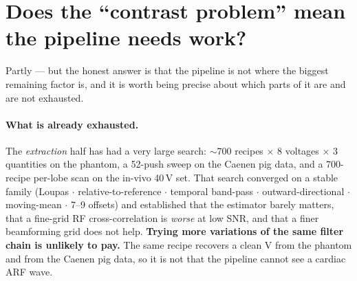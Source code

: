 \documentclass[11pt,a4paper]{article}
\newcommand{\good}[1]{\textcolor{green!45!black}{\textbf{#1}}}
\begin{document}
\section{Does the ``contrast problem'' mean the pipeline needs work?}\label{sec:pipeline}
Partly --- but the honest answer is that the pipeline is not where the biggest remaining factor is,
and it is worth being precise about which parts of it are and are not exhausted.

\paragraph{What is already exhausted.} The \emph{extraction} half has had a very large search:
$\sim$700 recipes $\times$ 8 voltages $\times$ 3 quantities on the phantom, a 52-push sweep on the
Caenen pig data, and a 700-recipe per-lobe scan on the in-vivo 40\,V set. That search converged on a
stable family (Loupas $\cdot$ relative-to-reference $\cdot$ temporal band-pass $\cdot$
outward-directional $\cdot$ moving-mean $\cdot$ 7--9 offsets) and established that the estimator
barely matters, that a fine-grid RF cross-correlation is \emph{worse} at low SNR, and that a finer
beamforming grid does not help. \good{Trying more variations of the same filter chain is unlikely to
pay.} The same recipe recovers a clean V from the phantom and from the Caenen pig data, so it is not
that the pipeline cannot see a cardiac ARF wave.
\end{document}
